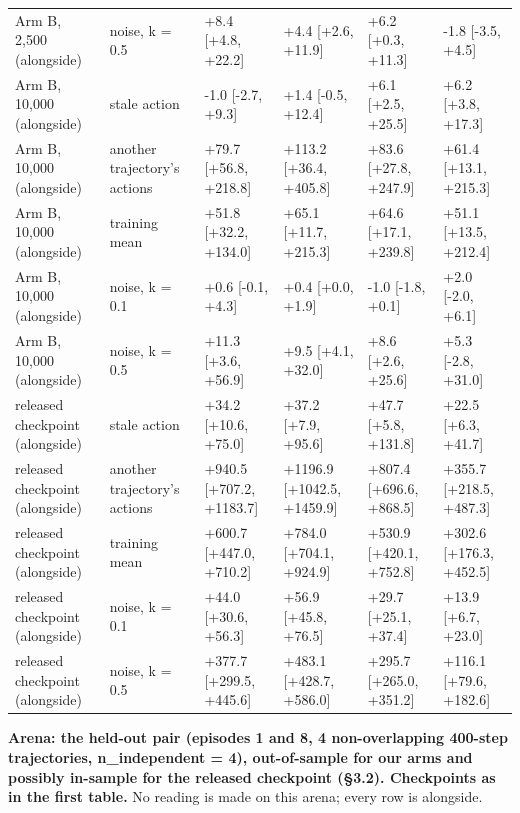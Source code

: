 \documentclass[10pt]{article}
\begin{document}
\begin{center}
{\begin{tabular}{llllll}
Arm B, 2,500 (alongside) & noise, k = 0.5 & +8.4 [+4.8, +22.2] & +4.4 [+2.6, +11.9] & +6.2 [+0.3, +11.3] & -1.8 [-3.5, +4.5] \\
Arm B, 10,000 (alongside) & stale action & -1.0 [-2.7, +9.3] & +1.4 [-0.5, +12.4] & +6.1 [+2.5, +25.5] & +6.2 [+3.8, +17.3] \\
Arm B, 10,000 (alongside) & another trajectory's actions & +79.7 [+56.8, +218.8] & +113.2 [+36.4, +405.8] & +83.6 [+27.8, +247.9] & +61.4 [+13.1, +215.3] \\
Arm B, 10,000 (alongside) & training mean & +51.8 [+32.2, +134.0] & +65.1 [+11.7, +215.3] & +64.6 [+17.1, +239.8] & +51.1 [+13.5, +212.4] \\
Arm B, 10,000 (alongside) & noise, k = 0.1 & +0.6 [-0.1, +4.3] & +0.4 [+0.0, +1.9] & -1.0 [-1.8, +0.1] & +2.0 [-2.0, +6.1] \\
Arm B, 10,000 (alongside) & noise, k = 0.5 & +11.3 [+3.6, +56.9] & +9.5 [+4.1, +32.0] & +8.6 [+2.6, +25.6] & +5.3 [-2.8, +31.0] \\
released checkpoint (alongside) & stale action & +34.2 [+10.6, +75.0] & +37.2 [+7.9, +95.6] & +47.7 [+5.8, +131.8] & +22.5 [+6.3, +41.7] \\
released checkpoint (alongside) & another trajectory's actions & +940.5 [+707.2, +1183.7] & +1196.9 [+1042.5, +1459.9] & +807.4 [+696.6, +868.5] & +355.7 [+218.5, +487.3] \\
released checkpoint (alongside) & training mean & +600.7 [+447.0, +710.2] & +784.0 [+704.1, +924.9] & +530.9 [+420.1, +752.8] & +302.6 [+176.3, +452.5] \\
released checkpoint (alongside) & noise, k = 0.1 & +44.0 [+30.6, +56.3] & +56.9 [+45.8, +76.5] & +29.7 [+25.1, +37.4] & +13.9 [+6.7, +23.0] \\
released checkpoint (alongside) & noise, k = 0.5 & +377.7 [+299.5, +445.6] & +483.1 [+428.7, +586.0] & +295.7 [+265.0, +351.2] & +116.1 [+79.6, +182.6] \\
\bottomrule\end{tabular}}\end{center}

\textbf{Arena: the held-out pair (episodes 1 and 8, 4 non-overlapping 400-step trajectories, n\_independent = 4), out-of-sample for our arms and possibly in-sample for the released checkpoint (\S{}3.2). Checkpoints as in the first table.} No reading is made on this arena; every row is alongside.
\end{document}
